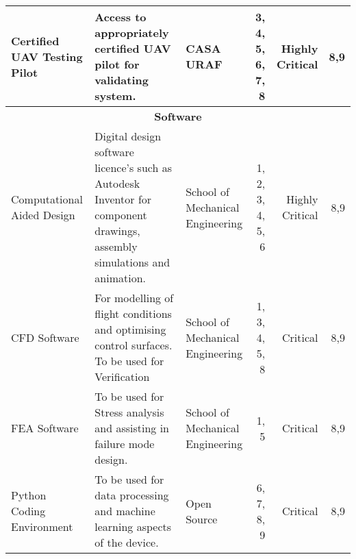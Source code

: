 \begin{table}[]
{\begin{tabular}{|p{4cm}|p{12cm}|p{8cm}|r|r|r|}
Certified UAV Testing Pilot                & Access to appropriately certified UAV pilot for validating system.                                          & CASA URAF                                                                                                     & 3, 4, 5, 6, 7, 8                               & Highly Critical                           & 8,9                                        \\ \hline
\multicolumn{6}{|c|}{\textbf{Software}}                                                                                                                                                                                                                                                                                                                                                                                                                                             \\ \hline
Computational Aided Design                 & Digital design software licence's such as Autodesk Inventor for component drawings, assembly simulations and animation.                                                        & School of Mechanical Engineering                                                                             & 1, 2, 3, 4, 5, 6                                        & Highly Critical                           & 8,9                                        \\ \hline
CFD Software                               & For modelling of flight conditions and optimising control surfaces. To be used for Verification                                                                               & School of Mechanical Engineering                                                                             & 1, 3, 4, 5, 8                                  & Critical                                  & 8,9                                        \\ \hline
FEA Software                               & To be used for Stress analysis and assisting in failure mode design.                                                                                                          & School of Mechanical Engineering                                                                             & 1, 5                                           & Critical                                  & 8,9                                        \\ \hline
Python Coding Environment                  & To be used for data processing and machine learning aspects of the device.                                                                                                    & Open Source                                                                                                  & 6, 7, 8, 9                                        & Critical                                   & 8,9                                        \\ \hline

\end{tabular}}
\end{table}
